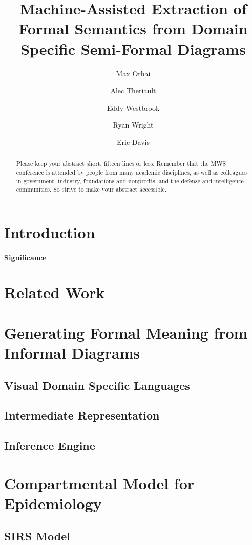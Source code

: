 \documentclass[11pt]{article}
\date{\vspace{-5ex}}
\author[1]{Max Orhai}
\author[1]{Alec Theriault}
\author[1]{Eddy Westbrook}
\author[1]{Ryan Wright}
\author[1]{Eric Davis}
\affil[1]{Galois, Inc}
\title{Machine-Assisted Extraction of Formal Semantics from Domain Specific Semi-Formal Diagrams}
\begin{document}
\maketitle
\vspace{10pt}
\begin{abstract}
Please keep your abstract short, fifteen lines or less.  Remember that the MWS conference is attended by people from many academic disciplines, as well as colleagues in government, industry, foundations and nonprofits, and the defense and intelligence communities.  So strive to make your abstract accessible.
\end{abstract}

\section{Introduction}

\paragraph{Significance}

\section{Related Work}

\section{Generating Formal Meaning from Informal Diagrams}

\subsection{Visual Domain Specific Languages}

\subsection{Intermediate Representation}

\subsection{Inference Engine}

\section{Compartmental Model for Epidemiology}

\subsection{SIRS Model}
\end{document}
